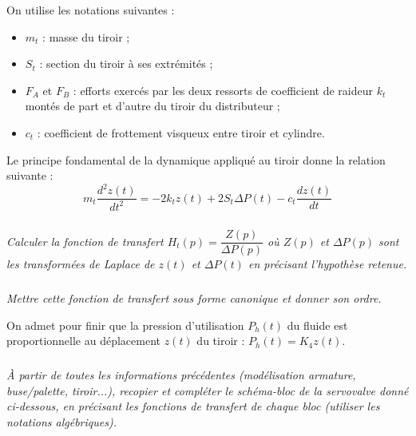 \documentclass[11pt,oneside]{article}
\begin{document}
{On utilise les notations suivantes :
\begin{itemize}
\item $m_t$ : masse du tiroir ;
\item $S_t$ : section du tiroir à ses extrémités ;
\item $F_A$ et $F_B$ : efforts exercés par les deux ressorts de coefficient de raideur $k_t$ montés de part et d’autre
du tiroir du distributeur ;
\item $c_t$ : coefficient de frottement visqueux entre tiroir et cylindre.
\end{itemize}

Le principe fondamental de la dynamique appliqué au tiroir donne la relation suivante :
$$
m_t\dfrac{d^2z(t)}{dt^2} = -2k_tz(t) + 2S_t\Delta P(t) -c_t \dfrac{dz(t)}{dt}
$$
}

\subparagraph{}
\textit{Calculer la fonction de transfert $H_t(p)=\dfrac{Z(p)}{\Delta P(p)}$ 
où $Z(p)$ et $\Delta P(p)$ sont les transformées de Laplace de $z(t)$ et 
$\Delta P(t)$ en précisant l'hypothèse retenue.}

\subparagraph{}
\textit{Mettre cette fonction de transfert sous forme canonique et donner son ordre.}

On admet pour finir que la pression d'utilisation $P_h(t)$ du fluide est proportionnelle au déplacement $z(t)$ du tiroir : $P_h(t) =K_4 z(t)$.

\subparagraph{}
\textit{\`A partir de toutes les informations précédentes (modélisation armature, buse/palette,
tiroir...), recopier et compléter le schéma-bloc de la servovalve donné ci-dessous, en précisant les
fonctions de transfert de chaque bloc (utiliser les notations algébriques).}
\end{document}
